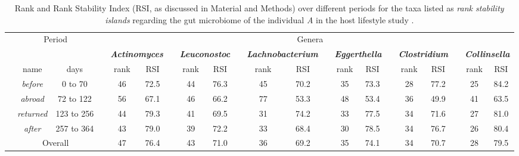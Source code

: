 \documentclass[12pt,oneside,letterpaper]{article}
\begin{document}
\clearpage

\begin{sidewaystable}
\caption{Rank and Rank Stability Index (RSI, as discussed in Material and Methods) over different periods for the taxa listed as \emph{rank stability islands} regarding the gut microbiome of the individual \emph{A} in the host lifestyle study \cite{hostlife}.}
 
  \begin{center}
  \small
    \begin{tabular}{*{21}{c}}
\cline{2-3}\cline{5-21}
	\multicolumn{1}{c}{\rule[-4mm]{0mm}{10mm}}\vline&\multicolumn{2}{c}{Period}\vline&
	\multicolumn{1}{c}{}\vline&\multicolumn{17}{c}{Genera}\vline\\
\cline{2-3}\cline{5-21}
\rule[-3mm]{0mm}{9mm}&&&&
	\multicolumn{2}{c}{\bf\emph{Actinomyces}}&&\multicolumn{2}{c}{\bf\emph{Leuconostoc}}&&
	\multicolumn{2}{c}{\bf\emph{Lachnobacterium}}&&\multicolumn{2}{c}{\bf\emph{Eggerthella}}&&
	\multicolumn{2}{c}{\bf\emph{Clostridium}}&&\multicolumn{2}{c}{\bf\emph{Collinsella}}\\
\cline{5-6}\cline{8-9}\cline{11-12}\cline{14-15}\cline{17-18}\cline{20-21}
\rule[-3mm]{0mm}{9mm}&name&days&&					rank&RSI&&	rank&RSI&&	rank&RSI&&	rank&RSI&&	rank&RSI&&	rank&RSI\\
\cline{2-3}\cline{5-6}\cline{8-9}\cline{11-12}\cline{14-15}\cline{17-18}\cline{20-21}
\rule[-2mm]{0mm}{7mm}&\emph{before}&0 to 70&&		46&72.5&&	44&76.3&&	45&70.2&&	35&73.3&&	28&77.2&&	25&84.2\\
\rule[-2mm]{0mm}{7mm}&\emph{abroad}&72 to 122&&		56&67.1&&	46&66.2&&	77&53.3&&	48&53.4&&	36&49.9&&	41&63.5\\
\rule[-2mm]{0mm}{7mm}&\emph{returned}&123 to 256&&	44&79.3&&	41&69.5&&	31&74.2&&	33&77.5&&	34&71.6&&	27&81.0\\
\rule[-2mm]{0mm}{7mm}&\emph{after}&257 to 364&&		43&79.0&&	39&72.2&&	33&68.4&&	30&78.5&&	34&76.7&&	26&80.4\\
\cline{2-3}\cline{5-6}\cline{8-9}\cline{11-12}\cline{14-15}\cline{17-18}\cline{20-21}
\rule[-3mm]{0mm}{8mm}&\multicolumn{2}{c}{Overall}&&	47&76.4&&	43&71.0&&	36&69.2&&	35&74.1&&	34&70.7&&	28&79.5\\
\cline{2-3}\cline{5-21}
    \end{tabular}
  \end{center}
  \label{tab:HLS_RSI}
\end{sidewaystable}

\end{document}
